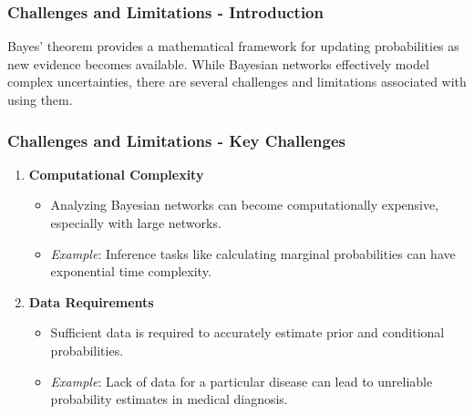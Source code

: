 \documentclass[aspectratio=169]{beamer}
\begin{document}
\begin{frame}[fragile]
    \frametitle{Challenges and Limitations - Introduction}
    Bayes' theorem provides a mathematical framework for updating probabilities as new evidence becomes available. 
    While Bayesian networks effectively model complex uncertainties, there are several challenges and limitations associated with using them.
\end{frame}

\begin{frame}[fragile]
    \frametitle{Challenges and Limitations - Key Challenges}
    \begin{enumerate}
        \item \textbf{Computational Complexity} 
        \begin{itemize}
            \item Analyzing Bayesian networks can become computationally expensive, especially with large networks.
            \item \textit{Example}: Inference tasks like calculating marginal probabilities can have exponential time complexity.
        \end{itemize}
        
        \item \textbf{Data Requirements} 
        \begin{itemize}
            \item Sufficient data is required to accurately estimate prior and conditional probabilities.
            \item \textit{Example}: Lack of data for a particular disease can lead to unreliable probability estimates in medical diagnosis.
        \end{itemize}
    \end{enumerate}
\end{frame}
\end{document}
